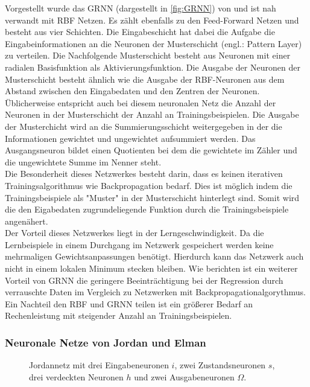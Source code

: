 Vorgestellt wurde das GRNN (dargestellt in \autoref{fig:GRNN}) von \citet{Specht1991} und ist nah verwandt mit RBF Netzen. Es zählt ebenfalls zu den Feed-Forward Netzen und besteht aus vier Schichten. Die Eingabeschicht hat dabei die Aufgabe die Eingabeinformationen an die Neuronen der Musterschicht (engl.: Pattern Layer) zu verteilen. Die Nachfolgende Musterschicht besteht aus Neuronen mit einer radialen Basisfunktion als Aktivierungsfunktion. Die Ausgabe der Neuronen der Musterschicht besteht ähnlich wie die Ausgabe der RBF-Neuronen aus dem Abstand zwischen den Eingabedaten und den Zentren der Neuronen. Üblicherweise entspricht auch bei diesem neuronalen Netz die Anzahl der Neuronen in der Musterschicht der Anzahl an Trainingsbeispielen. Die Ausgabe der Musterchicht wird an die Summierungsschicht weitergegeben in der die Informationen gewichtet und ungewichtet aufsummiert werden. Das Ausgangsneuron bildet einen Quotienten bei dem die gewichtete im Zähler und die ungewichtete Summe im Nenner steht.\\
Die Besonderheit dieses Netzwerkes besteht darin, dass es keinen iterativen Trainingsalgorithmus wie Backpropagation bedarf. Dies ist möglich indem die Trainingsbeispiele als "Muster" in der Musterschicht hinterlegt sind. Somit wird die den Eigabedaten zugrundeliegende Funktion durch die Trainingsbeispiele angenähert. \\
Der Vorteil dieses Netzwerkes liegt in der Lerngeschwindigkeit. Da die Lernbeispiele in einem Durchgang im Netzwerk gespeichert werden keine mehrmaligen Gewichtsanpassungen benötigt. Hierdurch kann das Netzwerk auch nicht in einem lokalen Minimum stecken bleiben. Wie \citet{Marqueza1993} berichten ist ein weiterer Vorteil von GRNN die geringere Beeinträchtigung bei der Regression durch verrauschte Daten im Vergleich zu Netzwerken mit Backpropagationalgorythmus.
Ein Nachteil den RBF und GRNN teilen ist ein größerer Bedarf an Rechenleistung mit steigender Anzahl an Trainingsbeispielen.  


\subsubsection{Neuronale Netze von Jordan und Elman}%
\begin{figure}[!htb]
    \centering
        
    \caption{Jordannetz mit drei Eingabeneuronen $i$, zwei Zustandsneuronen $s$, drei verdeckten Neuronen $h$ und zwei Ausgabeneuronen $\Omega$.}
    \label{fig:Hopfield}
\end{figure}

